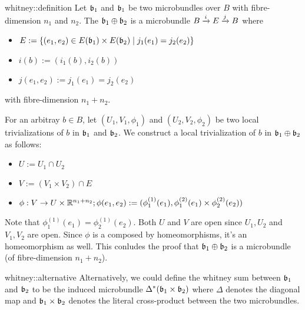 \begin{mydefinition}{whitney::definition}
    Let $\bb_1$ and $\bb_1$ be two microbundles over $B$ with fibre-dimension $n_1$ and $n_2$.
    The  $\bb_1 \oplus \bb_2$ is a microbundle $\bundle{B}{E}{i}{j}$ where
    \begin{itemize}
        \item $E := \{ (e_1, e_2) \in E(\bb_1) \times E(\bb_2) \mid j_1(e_1) = j_2(e_2)\}$
        \item $i(b) := (i_1(b), i_2(b))$
        \item $j(e_1, e_2) := j_1(e_1) = j_2(e_2)$
    \end{itemize}
    with fibre-dimension $n_1 + n_2$.
\end{mydefinition}
\begin{myproof}
    For an arbitray $b \in B$, let $(U_1, V_1, \phi_1)$ and $(U_2, V_2, \phi_2)$ be two local trivializations of $b$ in $\bb_1$ and $\bb_2$.
    We construct a local trivialization of $b$ in $\bb_1 \oplus \bb_2$ as follows:
    \begin{itemize}
        \item $U := U_1 \cap U_2$
        \item $V := (V_1 \times V_2) \cap E$
        \item $\phi: V \to U \times \R^{n_1 + n_2}; \phi(e_1, e_2) := (\phi_1^{(1)}(e_1), \phi_1^{(2)}(e_1) \times  \phi_2^{(2)}(e_2))$
    \end{itemize}
    Note that $\phi_1^{(1)}(e_1) = \phi_2^{(1)}(e_2)$.
    Both $U$ and $V$ are open since $U_1, U_2$ and $V_1, V_2$ are open.
    Since $\phi$ is a composed by homeomorphisms, it's an homeomorphism as well.
    This conludes the proof that $\bb_1 \oplus \bb_2$ is a microbundle (of fibre-dimension $n_1 + n_2$).
\end{myproof}

\begin{myremark}{whitney::alternative}
    Alternatively, we could define the whitney sum between $\bb_1$ and $\bb_2$ to be the induced microbundle $\Delta^*(\bb_1 \times \bb_2)$
    where $\Delta$ denotes the diagonal map and $\bb_1 \times \bb_2$ denotes the literal cross-product between the two microbundles.
\end{myremark}